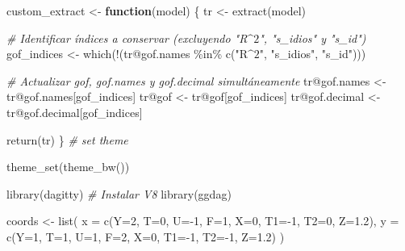\documentclass[
  12pt,
  a4paper,
]{article}
\newenvironment{Shaded}{\begin{snugshade}}{\end{snugshade}}
\newcommand{\AttributeTok}[1]{\textcolor[rgb]{0.77,0.63,0.00}{#1}}
\newcommand{\CommentTok}[1]{\textcolor[rgb]{0.56,0.35,0.01}{\textit{#1}}}
\newcommand{\ControlFlowTok}[1]{\textcolor[rgb]{0.13,0.29,0.53}{\textbf{#1}}}
\newcommand{\DecValTok}[1]{\textcolor[rgb]{0.00,0.00,0.81}{#1}}
\newcommand{\FloatTok}[1]{\textcolor[rgb]{0.00,0.00,0.81}{#1}}
\newcommand{\FunctionTok}[1]{\textcolor[rgb]{0.00,0.00,0.00}{#1}}
\newcommand{\NormalTok}[1]{#1}
\newcommand{\OtherTok}[1]{\textcolor[rgb]{0.56,0.35,0.01}{#1}}
\newcommand{\SpecialCharTok}[1]{\textcolor[rgb]{0.00,0.00,0.00}{#1}}
\newcommand{\StringTok}[1]{\textcolor[rgb]{0.31,0.60,0.02}{#1}}
\begin{document}
\begin{Shaded}
\begin{Highlighting}[]
\NormalTok{custom\_extract }\OtherTok{\textless{}{-}} \ControlFlowTok{function}\NormalTok{(model) \{}
\NormalTok{  tr }\OtherTok{\textless{}{-}} \FunctionTok{extract}\NormalTok{(model)}
  
  \CommentTok{\# Identificar índices a conservar (excluyendo "R$\^{}2$", "s\_idios" y "s\_id")}
\NormalTok{  gof\_indices }\OtherTok{\textless{}{-}} \FunctionTok{which}\NormalTok{(}\SpecialCharTok{!}\NormalTok{(tr}\SpecialCharTok{@}\NormalTok{gof.names }\SpecialCharTok{\%in\%} \FunctionTok{c}\NormalTok{(}\StringTok{"R$\^{}2$"}\NormalTok{, }\StringTok{"s\_idios"}\NormalTok{, }\StringTok{"s\_id"}\NormalTok{)))}
  
  \CommentTok{\# Actualizar gof, gof.names y gof.decimal simultáneamente}
\NormalTok{  tr}\SpecialCharTok{@}\NormalTok{gof.names }\OtherTok{\textless{}{-}}\NormalTok{ tr}\SpecialCharTok{@}\NormalTok{gof.names[gof\_indices]}
\NormalTok{  tr}\SpecialCharTok{@}\NormalTok{gof }\OtherTok{\textless{}{-}}\NormalTok{ tr}\SpecialCharTok{@}\NormalTok{gof[gof\_indices]}
\NormalTok{  tr}\SpecialCharTok{@}\NormalTok{gof.decimal }\OtherTok{\textless{}{-}}\NormalTok{ tr}\SpecialCharTok{@}\NormalTok{gof.decimal[gof\_indices]}
  
  \FunctionTok{return}\NormalTok{(tr)}
\NormalTok{\}}
\CommentTok{\# set theme}

\FunctionTok{theme\_set}\NormalTok{(}\FunctionTok{theme\_bw}\NormalTok{())}


\FunctionTok{library}\NormalTok{(dagitty) }\CommentTok{\# Instalar V8}
\FunctionTok{library}\NormalTok{(ggdag)}

\NormalTok{coords }\OtherTok{\textless{}{-}} \FunctionTok{list}\NormalTok{(}
  \AttributeTok{x =} \FunctionTok{c}\NormalTok{(}\AttributeTok{Y=}\DecValTok{2}\NormalTok{, }\AttributeTok{T=}\DecValTok{0}\NormalTok{, }\AttributeTok{U=}\SpecialCharTok{{-}}\DecValTok{1}\NormalTok{, }\AttributeTok{F=}\DecValTok{1}\NormalTok{, }\AttributeTok{X=}\DecValTok{0}\NormalTok{, }\AttributeTok{T1=}\SpecialCharTok{{-}}\DecValTok{1}\NormalTok{, }\AttributeTok{T2=}\DecValTok{0}\NormalTok{, }\AttributeTok{Z=}\FloatTok{1.2}\NormalTok{),}
  \AttributeTok{y =} \FunctionTok{c}\NormalTok{(}\AttributeTok{Y=}\DecValTok{1}\NormalTok{, }\AttributeTok{T=}\DecValTok{1}\NormalTok{, }\AttributeTok{U=}\DecValTok{1}\NormalTok{, }\AttributeTok{F=}\DecValTok{2}\NormalTok{, }\AttributeTok{X=}\DecValTok{0}\NormalTok{, }\AttributeTok{T1=}\SpecialCharTok{{-}}\DecValTok{1}\NormalTok{, }\AttributeTok{T2=}\SpecialCharTok{{-}}\DecValTok{1}\NormalTok{, }\AttributeTok{Z=}\FloatTok{1.2}\NormalTok{)}
\NormalTok{  )}


\end{Highlighting}
\end{Shaded}
\end{document}
